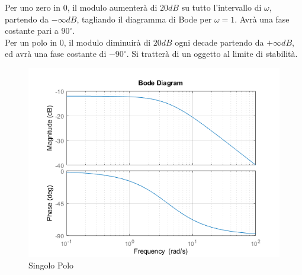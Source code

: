 \documentclass{article}
\numberwithin{equation}{subsection}
\begin{document}
\begin{center}
\end{center}

Per uno zero in $0$, il modulo aumenterà di $20dB$ su tutto l'intervallo di $\omega$, partendo da $-\infty dB$, tagliando il diagramma di Bode per $\omega=1$. 
Avrà una fase costante pari a $90^{\circ}$. \\
Per un polo in $0$, il modulo diminuirà di $20dB$ ogni decade partendo da $+\infty dB$, ed avrà una fase costante di $-90^{\circ}$. Si tratterà di un oggetto 
al limite di stabilità. 

\begin{figure}
    \includegraphics[width=\textwidth]{Bode1Polo}
    \caption{Singolo Polo}
\end{figure}
\end{document}
